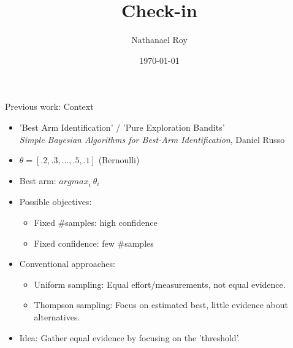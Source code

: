 \documentclass{beamer}
\title[Short title]{Check-in} %
\author{Nathanael Roy} %
\institute[UC Riverside] %
{
University of California \\ %
\medskip
}
\date{\today} %
\begin{document}




\begin{frame}{Previous work: Context}
    \begin{itemize}
        \item 'Best Arm Identification' / 'Pure Exploration Bandits'\\
            \emph{Simple Bayesian Algorithms for Best-Arm Identification}, Daniel Russo
        \item $\theta = [.2, .3, \dots, .5, .1]$ (Bernoulli)
        \item Best arm: ${arg max}_i\ \theta_i$
        \item Possible objectives:
            \begin{itemize}
                \item Fixed \#samples: high confidence
                \item Fixed confidence: few \#samples
            \end{itemize}
        \item Conventional approaches:
            \begin{itemize}
                \item Uniform sampling: Equal effort/measurements, not equal evidence.
                \item Thompson sampling: Focus on estimated best, little evidence about alternatives.
            \end{itemize}
        \item Idea: Gather equal evidence by focusing on the 'threshold'.
    \end{itemize}
\end{frame}
\end{document}
